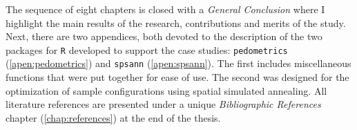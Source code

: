 The sequence of eight chapters is closed with a \emph{General Conclusion} where I highlight the main results 
of the research, contributions and merits of the study. Next, there are two appendices, both devoted to the 
description of the two packages for \texttt{R} developed to support the case studies: \texttt{pedometrics} 
(\autoref{apen:pedometrics}) and \texttt{spsann} (\autoref{apen:spsann}). The first includes miscellaneous 
functions that were put together for ease of use. The second was designed for the optimization of sample 
configurations using spatial simulated annealing. All literature references are presented under a unique 
\emph{Bibliographic References} chapter (\autoref{chap:references}) at the end of the thesis.
